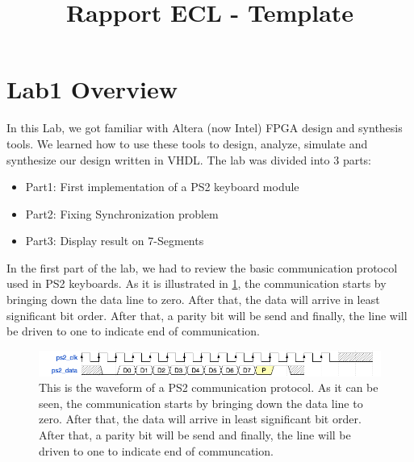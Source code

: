 \documentclass{rapportECL}
\title{Rapport ECL - Template} %
\begin{document}

\color{white}



        
\fairemarges %
\fairepagedegarde %
\tabledematieres %
\color{black}


\section{Lab1 Overview}


In this Lab, we got familiar with Altera (now Intel) FPGA design and synthesis tools. We learned how to use these tools to design, analyze, simulate and synthesize our design written in VHDL. The lab was divided into 3 parts:

\begin{itemize}
  \item Part1: First implementation of a PS2 keyboard module
  \item Part2: Fixing Synchronization problem
  \item Part3: Display result on 7-Segments
\end{itemize}

In the first part of the lab, we had to review the basic communication protocol used in PS2 keyboards. As it is illustrated in \ref{fig:ps2_wave}, the communication starts by bringing down the data line to zero. After that, the data will arrive in least significant bit order. After that, a parity bit  will be send and finally, the line will be driven to one to indicate end of communication.
\begin{figure}[h]
    \centering
    \includegraphics[width=15cm]{logos/ps2_wave.png}
    \caption{This is the waveform of a PS2 communication protocol. As it can be seen, the communication starts by bringing down the data line to zero. After that, the data will arrive in least significant bit order. After that, a parity bit  will be send and finally, the line will be driven to one to indicate end of communcation.}
    \label{fig:ps2_wave}
\end{figure}
\end{document}
